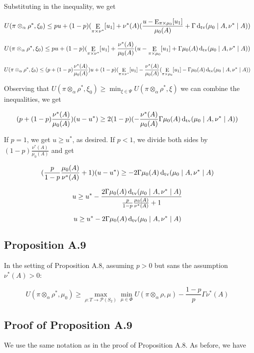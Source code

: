 \documentclass[a4paper]{article}
\DeclareMathOperator{\E}{E}
\newcommand{\Dtv}{\operatorname{d}_{\textnormal{tv}}}
\newcommand{\Prob}{\mathcal{P}}
\begin{document}
Substituting in the inequality, we get

$$U(\pi \otimes_\alpha \rho^*, \xi_0) \leq pu + (1-p) (\E_{\pi \times \nu^*}[u_1] + \nu^*(A)(\frac{u-\E_{\pi \times \mu_0}[u_1]}{\mu_0(A)}+\Gamma \Dtv(\mu_0 \mid A, \nu^* \mid A))$$

$$U(\pi \otimes_\alpha \rho^*, \xi_0) \leq pu + (1-p) (\E_{\pi \times \nu^*}[u_1] + \frac{\nu^*(A)}{\mu_0(A)}(u-\E_{\pi \times \mu_0}[u_1]+\Gamma \mu_0(A) \Dtv(\mu_0 \mid A, \nu^* \mid A))$$

$$U(\pi \otimes_\alpha \rho^*, \xi_0) \leq (p + (1-p)\frac{\nu^*(A)}{\mu_0(A)})u + (1-p) (\E_{\pi \times \nu^*}[u_1] - \frac{\nu^*(A)}{\mu_0(A)}(\E_{\pi \times \mu_0}[u_1]-\Gamma \mu_0(A) \Dtv(\mu_0 \mid A, \nu^* \mid A))$$

Observing that ${U(\pi \otimes_\alpha \rho^*, \xi_0) \geq \min_{\xi \in \Psi} U(\pi \otimes_\alpha \rho^*, \xi)}$ we can combine the inequalities, we get

$$(p + (1-p)\frac{\nu^*(A)}{\mu_0(A)})(u-u^*)\geq 2 (1-p) ( - \frac{\nu^*(A)}{\mu_0(A)}\Gamma\mu_0(A)\Dtv(\mu_0 \mid A, \nu^* \mid A))$$

If ${p = 1}$, we get ${u \geq u^*}$, as desired. If ${p < 1}$, we divide both sides by ${(1-p)\frac{\nu^*(A)}{\mu_0(A)}}$ and get

$$(\frac{p}{1-p}\frac{\mu_0(A)}{\nu^*(A)}+1)(u - u^*) \geq - 2\Gamma\mu_0(A)\Dtv(\mu_0 \mid A, \nu^* \mid A)$$

$$u \geq u^* - \frac{2\Gamma\mu_0(A)\Dtv(\mu_0 \mid A, \nu^* \mid A)}{\frac{p}{1-p}\frac{\mu_0(A)}{\nu^*(A)}+1}$$

$$u \geq u^* - 2\Gamma\mu_0(A)\Dtv(\mu_0 \mid A, \nu^* \mid A)$$

\subsection{Proposition A.9}

In the setting of Proposition A.8, assuming ${p > 0}$ but sans the assumption ${\nu^*(A) > 0}$:

$$U(\pi \otimes_\alpha \rho^*,\mu_0) \geq \max_{\rho: T \rightarrow \Prob(S_2)} \min_{\mu \in \Phi} U(\pi \otimes_\alpha \rho, \mu)-\frac{1-p}{p}\Gamma\nu^*(A)$$

\subsection{Proof of Proposition A.9}

We use the same notation as in the proof of Proposition A.8. As before, we have
\end{document}
